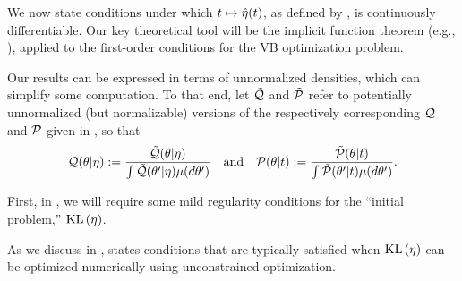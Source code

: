 We now state conditions under which $t \mapsto \hat\eta(t)$, as defined by
, is continuously differentiable.  Our key theoretical tool will
be the implicit function theorem (e.g., \citet{krantz:2012:implicit}), applied
to the first-order conditions for the VB optimization problem.

Our results can be expressed in terms of unnormalized densities, which can
simplify some computation.  To that end, let $\tilde{\mathcal{Q}}$ and $\tilde{\mathcal{P}}$ refer to
potentially unnormalized (but normalizable) versions of the respectively
corresponding $\mathcal{Q}$ and $\mathcal{P}$ given in , so that
%
\begin{align*}
%
\q(\theta \vert \eta) :={}
    \frac{\qtil(\theta \vert \eta)}
    {\int \qtil(\theta' \vert \eta) \mu(d\theta')} \mathand
\p(\theta \vert \t) :={}
    \frac{\ptil(\theta \vert \t)}
    {\int \ptil(\theta' \vert \t) \mu(d\theta')}.
%
\end{align*}

First, in , we will require some mild regularity conditions
for the ``initial problem,'' $\mathrm{KL}\left(\eta\right)$.
%
%
%

As we discuss in ,  states
conditions that are typically satisfied when $\mathrm{KL}\left(\eta\right)$ can be optimized
numerically using unconstrained optimization.

